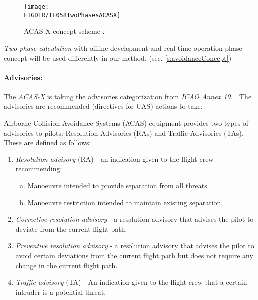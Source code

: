 \begin{figure}[H]
    \centering
    \texttt{[image: \\FIGDIR/TE058TwoPhasesACASX]}
    \caption{ACAS-X concept scheme \cite{netalert2013n17}.}
    \label{fig:acasxConceptScheme}
\end{figure}

\begin{note}
    \emph{Two-phase calculation} with offline development and real-time operation phase concept will be used differently in our method. (sec. \ref{s:avoidanceConcept})
\end{note}

\paragraph{Advisories:} The \emph{ACAS-X} is taking the advisories categorization from \emph{ICAO Annex 10.} \cite{annex200710}. The advisories are recommended (directives for UAS) actions to take.


Airborne Collision Avoidance Systems (ACAS) equipment provides two types of advisories to pilots: Resolution Advisories (RAs) and Traffic Advisories (TAs). These are defined as follows:

\begin{enumerate}
    
    \item \emph{Resolution advisory} (RA) - an indication given to the flight crew recommending:
    
    \begin{enumerate}[a.]
        \item Manoeuvre intended to provide separation from all threats.
        
        \item Manoeuvre restriction intended to maintain existing separation.
    \end{enumerate}
    
    \item \emph{Corrective resolution advisory} - a resolution advisory that advises the pilot to deviate from the current flight path.
    
    \item \emph{Preventive resolution advisory} - a resolution advisory that advises the pilot to avoid certain deviations from the current flight path but does not require any change in the current flight path.

    \item \emph{Traffic advisory} (TA) - An indication given to the flight crew that a certain intruder is a potential threat.
\end{enumerate}

